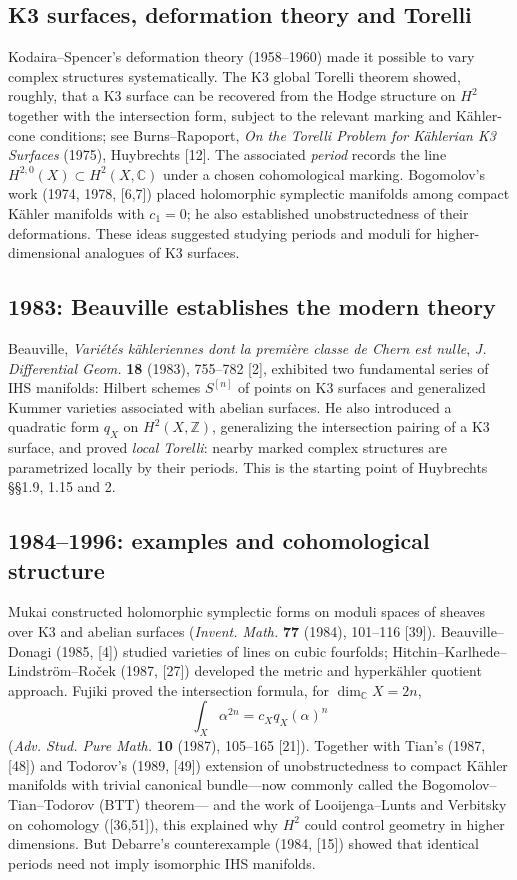 \documentclass[11pt]{article}
\begin{document}
\subsection{K3 surfaces, deformation theory and Torelli}
Kodaira--Spencer's deformation theory (1958--1960)
made it possible to vary complex structures
systematically. The K3 global Torelli theorem
showed, roughly, that a K3 surface can be recovered
from the Hodge structure on $H^2$ together with the
intersection form, subject to the relevant marking
and K\"ahler-cone conditions; see Burns--Rapoport,
\emph{On the Torelli Problem for K\"ahlerian K3
Surfaces} (1975), Huybrechts [12].
The associated \emph{period} records the line
$H^{2,0}(X)\subset H^2(X,\mathbb C)$ under a
chosen cohomological marking.
Bogomolov's work (1974, 1978, [6,7])
placed holomorphic symplectic manifolds among
compact K\"ahler manifolds with $c_1=0$;
he also established unobstructedness of their
deformations.
These ideas suggested studying periods and moduli
for higher-dimensional analogues of K3 surfaces.

\subsection{1983: Beauville establishes the modern theory}
Beauville, \emph{Vari\'et\'es k\"ahleriennes dont la
premi\`ere classe de Chern est nulle},
\emph{J. Differential Geom.} \textbf{18} (1983),
755--782 [2], exhibited two fundamental series
of IHS manifolds: Hilbert schemes $S^{[n]}$
of points on K3 surfaces and generalized Kummer
varieties associated with abelian surfaces.
He also introduced a quadratic form $q_X$
on $H^2(X,\mathbb Z)$, generalizing the
intersection pairing of a K3 surface, and
proved \emph{local Torelli}: nearby marked
complex structures are parametrized locally
by their periods. This is the starting point
of Huybrechts \S\S1.9, 1.15 and 2.

\subsection{1984--1996: examples and cohomological structure}
Mukai constructed holomorphic symplectic forms
on moduli spaces of sheaves over K3 and abelian
surfaces (\emph{Invent. Math.} \textbf{77} (1984),
101--116 [39]). Beauville--Donagi (1985, [4])
studied varieties of lines on cubic fourfolds;
Hitchin--Karlhede--Lindstr\"om--Ro\v cek (1987,
[27]) developed the metric and hyperk\"ahler
quotient approach. Fujiki proved the
intersection formula, for $\dim_{\mathbb C}X=2n$,
\[
\int_X\alpha^{2n}=c_Xq_X(\alpha)^n
\]
(\emph{Adv. Stud. Pure Math.} \textbf{10}
(1987), 105--165 [21]). Together with
Tian's (1987, [48]) and Todorov's
(1989, [49]) extension of unobstructedness
to compact K\"ahler manifolds with trivial
canonical bundle---now commonly called the
Bogomolov--Tian--Todorov (BTT) theorem--- and the work of
Looijenga--Lunts and Verbitsky on cohomology
([36,51]), this explained why $H^2$ could
control geometry in higher dimensions.
But Debarre's counterexample (1984, [15])
showed that identical periods need not
imply isomorphic IHS manifolds.
\end{document}

